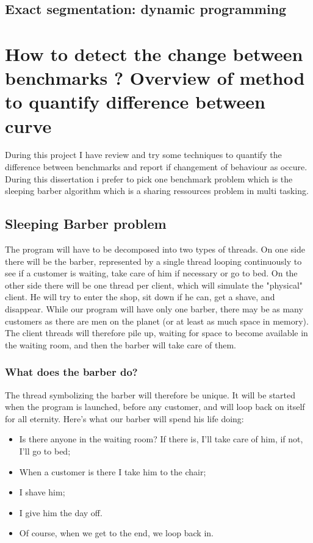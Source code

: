 \documentclass{article}
\begin{document}
\subsection{Exact segmentation: dynamic programming}



\section{ How to detect the change between benchmarks ? Overview of method to quantify difference between curve}

During this project I have review and try some techniques to quantify the difference between benchmarks and report if changement of behaviour as occure. During this dissertation i prefer to pick one benchmark problem which is the sleeping barber algorithm which is a sharing ressources problem in multi tasking.

\subsection{Sleeping Barber problem}
The program will have to be decomposed into two types of threads. On one side there will be the barber, represented by a single thread looping continuously to see if a customer is waiting, take care of him if necessary or go to bed. On the other side there will be one thread per client, which will simulate the "physical" client. He will try to enter the shop, sit down if he can, get a shave, and disappear.
While our program will have only one barber, there may be as many customers as there are men on the planet (or at least as much space in memory). The client threads will therefore pile up, waiting for space to become available in the waiting room, and then the barber will take care of them.

\subsubsection{ What does the barber do?}
The thread symbolizing the barber will therefore be unique. It will be started when the program is launched, before any customer, and will loop back on itself for all eternity.
Here's what our barber will spend his life doing:

\begin{itemize}
    \item Is there anyone in the waiting room? If there is, I'll take care of him, if not, I'll go to bed;
    \item When a customer is there I take him to the chair;
    \item I shave him;
    \item I give him the day off.
    \item Of course, when we get to the end, we loop back in.
\end{itemize}
\end{document}
